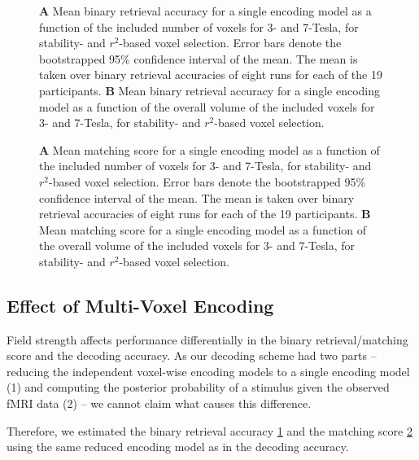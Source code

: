 \begin{figure}
  \centering
  \def\svgwidth{\linewidth}
  
	
  \caption{\textbf{A} Mean binary retrieval accuracy for a single encoding
  model as a function of the included number of voxels for 3- and 7-Tesla, for
  stability- and $r^2$-based voxel selection. Error bars denote the
  bootstrapped 95\% confidence interval of the mean. The mean is taken over
  binary retrieval accuracies of eight runs for each of the 19 participants.
  \textbf{B} Mean binary retrieval accuracy for a single encoding model as a
  function of the overall volume of the included voxels for 3- and 7-Tesla, for
stability- and $r^2$-based voxel selection.}

\label{fig:binary_retrieval_mve}
\end{figure}

\begin{figure}
  \centering
  \def\svgwidth{\linewidth}
  
	
  \caption{\textbf{A} Mean matching score for a single encoding model as a
  function of the included number of voxels for 3- and 7-Tesla, for stability-
  and $r^2$-based voxel selection. Error bars denote the bootstrapped 95\%
  confidence interval of the mean. The mean is taken over binary retrieval
  accuracies of eight runs for each of the 19 participants. \textbf{B} Mean
matching score for a single encoding model as a function of the overall volume
of the included voxels for 3- and 7-Tesla, for stability- and $r^2$-based voxel
selection.}

 \label{fig:matching_score_mve}
\end{figure}

\subsection*{Effect of Multi-Voxel Encoding}

Field strength affects performance differentially in the binary
retrieval/matching score and the decoding accuracy. As our decoding scheme had
two parts -- reducing the independent voxel-wise encoding models to a single
encoding model (1) and computing the posterior probability of a stimulus given
the observed f{MRI} data (2) -- we cannot claim what causes this difference.

Therefore, we estimated the binary retrieval accuracy
\ref{fig:binary_retrieval_mve} and the matching score
\ref{fig:matching_score_mve} using the same reduced encoding model as in the
decoding accuracy.

